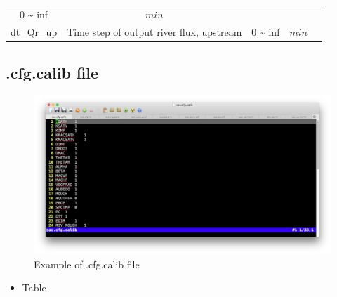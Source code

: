 \documentclass[]{scrbook}
\providecommand{\tightlist}{%
  \setlength{\itemsep}{0pt}\setlength{\parskip}{0pt}}
\begin{document}
\begin{longtable}[]{@{}ccccc@{}}
\begin{minipage}[t]{0.10\columnwidth}
0 \textasciitilde{} inf\strut
\end{minipage} & \begin{minipage}[t]{0.10\columnwidth}\centering\strut
\(min\)\strut
\end{minipage} & \begin{minipage}[t]{0.26\columnwidth}\centering\strut
\strut
\end{minipage}\tabularnewline
\begin{minipage}[t]{0.17\columnwidth}\centering\strut
dt\_Qr\_up\strut
\end{minipage} & \begin{minipage}[t]{0.23\columnwidth}\centering\strut
Time step of output river flux, upstream\strut
\end{minipage} & \begin{minipage}[t]{0.10\columnwidth}\centering\strut
0 \textasciitilde{} inf\strut
\end{minipage} & \begin{minipage}[t]{0.10\columnwidth}\centering\strut
\(min\)\strut
\end{minipage} & \begin{minipage}[t]{0.26\columnwidth}\centering\strut
\strut
\end{minipage}\tabularnewline
\bottomrule
\end{longtable}

\subsection{.cfg.calib file}\label{cfg.calib-file}

\begin{figure}
\centering
\includegraphics{Fig/IO/cfg.calib.png}
\caption{Example of .cfg.calib file}
\end{figure}

\begin{itemize}
\tightlist
\item
  Table
\end{itemize}
\end{document}
